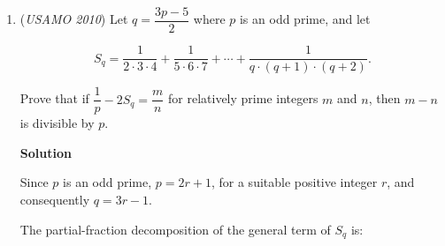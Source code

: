 \begin{enumerate}
 
 \begin{align*}   BD^2 &= AB^2 + AD^2        = (p^2-q^2)^2 + \left(\dfrac{q(p^2-q^2)}{p}\right)^2 \\        &= (p^2-q^2)^2\left[1 + \frac{q^2}{p^2}\right]        = \frac{(p^2-q^2)^2}{p^2}(p^2 + q^2) \end{align*}


 

 and so $BD$ is rational if and only if $p^2 + q^2$ is a perfect square.

 Combining the conditions on $CE$ and $BD$, we see that$2p^2+2q^2$ and $p^2+q^2$ must both be perfect squares. If it were so,their ratio, which is $2$, would be the square of a rational number,but $\sqrt{2}$ is irrational, and so the assumed triangle cannot exist.

 



\textbf{Solution 4}

We proceed by contradiction.

 FTSOC, let $AB, BI, ID$ have integer lengths. Then $BD = BI + ID \in \mathbb{Z}$ as well. By trigonometry, 
 \[BD = \frac{AB}{\cos{(\frac{\angle ABC}{2})}}.\]Rearranging we find $\cos{(\frac{\angle ABC}{2})} = \frac{AB}{BD} \in \mathbb{Q}$. As $0 < \angle ABC < \frac{\pi}{2}$ so $0 < \frac{\angle ABC}{2} < \frac{\pi}{4}$ but there are no possible angles in the interval that result in a rational cosine by Niven's theorem. So we have contradiction.

 


	\item (\textit{USAMO 2010}) Let $q = \dfrac{3p-5}{2}$ where $p$ is an odd prime, and let


 

 \[S_q =    \frac{1}{2\cdot 3 \cdot 4} +   \frac{1}{5\cdot 6 \cdot 7} + \cdots +   \frac{1}{q\cdot (q+1) \cdot (q+2)}.\]


 


 Prove that if $\dfrac{1}{p}-2S_q = \dfrac{m}{n}$ for relatively prime integers
$m$ and $n$, then $m-n$ is divisible by $p$.


 



\textbf{Solution}

Since $p$ is an odd prime, $p = 2r + 1$, for a suitable positive integer $r$, and consequently $q = 3r - 1$.

 The partial-fraction decomposition of the general term of $S_q$ is:


\end{enumerate}
